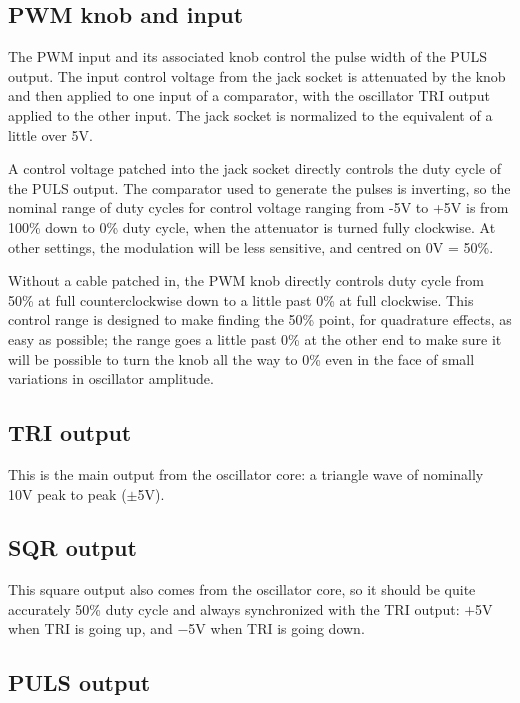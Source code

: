 \subsection{PWM knob and input}

The PWM input and its associated knob control the pulse width of the PULS
output.  The input control voltage from the jack socket is attenuated by the
knob and then applied to one input of a comparator, with the oscillator TRI
output applied to the other input.  The jack socket is normalized to the
equivalent of a little over 5V.

A control voltage patched into the jack socket directly controls the duty
cycle of the PULS output.  The comparator used to generate the pulses is
inverting, so the nominal range of duty cycles for control voltage ranging
from -5V to +5V is from 100\% down to 0\% duty cycle, when the attenuator is
turned fully clockwise.  At other settings, the modulation will be less
sensitive, and centred on 0V = 50\%.

Without a cable patched in, the PWM knob directly controls duty cycle from
50\% at full counterclockwise down to a little past 0\% at full clockwise. 
This control range is designed to make finding the 50\% point, for
quadrature effects, as easy as possible; the range goes a little past 0\%
at the other end to make sure it will be possible to turn the knob all the
way to 0\% even in the face of small variations in oscillator amplitude.

\subsection{TRI output}

This is the main output from the oscillator core:  a triangle wave of
nominally 10V peak to peak ($\pm$5V).

\subsection{SQR output}

This square output also comes from the oscillator core, so it should be
quite accurately 50\% duty cycle and always synchronized with the TRI
output: $+$5V when TRI is going up, and $-$5V when TRI is going down.

\subsection{PULS output}

